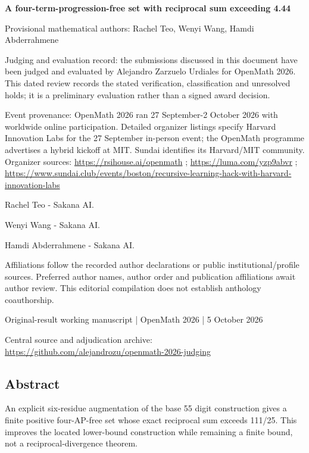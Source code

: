 \documentclass[11pt,a4paper]{article}
\begin{document}
{\LARGE\bfseries A four-term-progression-free set with reciprocal sum exceeding 4.44\par}\medskip
{\small Provisional mathematical authors: Rachel Teo, Wenyi Wang, Hamdi Abderrahmene\par}\medskip
{\small Judging and evaluation record: the submissions discussed in this document have been judged and evaluated by Alejandro Zarzuelo Urdiales for OpenMath 2026. This dated review records the stated verification, classification and unresolved holds; it is a preliminary evaluation rather than a signed award decision.\par}

{\small Event provenance: OpenMath 2026 ran 27 September-2 October 2026 with worldwide online participation. Detailed organizer listings specify Harvard Innovation Labs for the 27 September in-person event; the OpenMath programme advertises a hybrid kickoff at MIT. Sundai identifies its Harvard/MIT community. Organizer sources: \url{https://rsihouse.ai/openmath} ; \url{https://luma.com/yzp9abvr} ; \url{https://www.sundai.club/events/boston/recursive-learning-hack-with-harvard-innovation-labs}\par}

{\small Rachel Teo  -  Sakana AI.\par}

{\small Wenyi Wang  -  Sakana AI.\par}

{\small Hamdi Abderrahmene  -  Sakana AI.\par}

{\small Affiliations follow the recorded author declarations or public institutional/profile sources. Preferred author names, author order and publication affiliations await author review. This editorial compilation does not establish anthology coauthorship.\par}

{\small Original-result working manuscript | OpenMath 2026 | 5 October 2026\par}\medskip
{\small Central source and adjudication archive: \url{https://github.com/alejandrozu/openmath-2026-judging}\par}

\subsection{Abstract}
An explicit six-residue augmentation of the base 55 digit construction gives a finite positive four-AP-free set whose exact reciprocal sum exceeds 111/25. This improves the located lower-bound construction while remaining a finite bound, not a reciprocal-divergence theorem.
\end{document}

